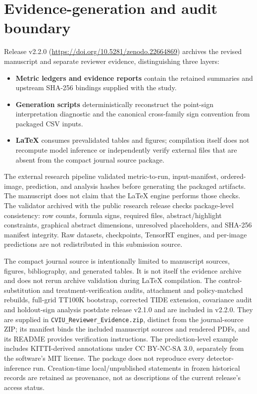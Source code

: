 \documentclass[10pt]{article}
\begin{document}
\FloatBarrier

\section{Evidence-generation and audit boundary}

Release v2.2.0 (\url{https://doi.org/10.5281/zenodo.22664869}) archives the
revised manuscript and separate reviewer evidence, distinguishing three layers:
\begin{itemize}
  \item \textbf{Metric ledgers and evidence reports} contain the retained
  summaries and upstream SHA-256 bindings supplied with the study.
  \item \textbf{Generation scripts} deterministically reconstruct the
  point-sign interpretation diagnostic and the canonical cross-family sign convention
  from packaged CSV inputs.
  \item \textbf{LaTeX} consumes prevalidated tables and figures; compilation
  itself does not recompute model inference or independently verify external
  files that are absent from the compact journal source package.
\end{itemize}

The external research pipeline validated metric-to-run, input-manifest,
ordered-image, prediction, and analysis hashes before generating the packaged
artifacts. The manuscript does not claim that the LaTeX engine performs those
checks. The validator archived with the public research release checks
package-level consistency: row counts,
formula signs, required files, abstract/highlight constraints, graphical
abstract dimensions, unresolved placeholders, and SHA-256 manifest integrity.
Raw datasets, checkpoints, TensorRT engines, and per-image predictions are not
redistributed in this submission source.

The compact journal source is intentionally limited to manuscript sources,
figures, bibliography, and generated tables. It is not itself the evidence
archive and does not rerun archive validation during LaTeX compilation.
The control-substitution and treatment-verification audits, attachment and policy-matched rebuilds, full-grid TT100K bootstrap, corrected TIDE extension, covariance audit and holdout-sign analysis postdate release v2.1.0 and are included in v2.2.0. They are supplied in \texttt{CVIU\_Reviewer\_Evidence.zip}, distinct from the journal-source ZIP; its manifest binds the included manuscript sources and rendered PDFs, and its README provides verification instructions. The prediction-level example includes KITTI-derived annotations under CC BY-NC-SA 3.0, separately from the software's MIT license. The package does not reproduce every detector-inference run. Creation-time local/unpublished statements in frozen historical records are retained as provenance, not as descriptions of the current release's access status.
\end{document}
